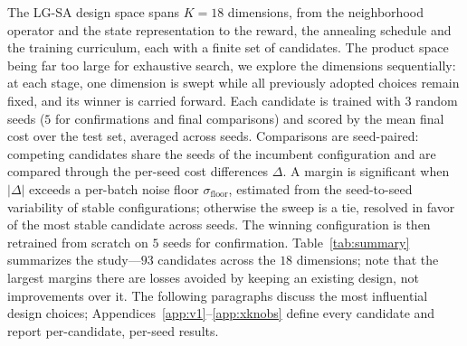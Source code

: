 \documentclass[letterpaper]{article} %
\begin{document}
The LG-SA design space spans $K=18$ dimensions, from the neighborhood
operator and the state representation to the reward, the annealing schedule
and the training curriculum, each with a finite set of candidates. The
product space being far too large for exhaustive search, we explore the
dimensions sequentially: at each stage, one dimension is swept while all
previously adopted choices remain fixed, and its winner is carried forward.
Each candidate is trained with $3$ random seeds ($5$ for confirmations and
final comparisons) and scored by the mean final cost over the test set,
averaged across seeds. Comparisons are seed-paired: competing candidates
share the seeds of the incumbent configuration and are compared through
the per-seed cost differences $\Delta$. A margin is significant when
$|\Delta|$ exceeds a per-batch noise floor $\sigma_{\mathrm{floor}}$,
estimated from the seed-to-seed variability of stable configurations;
otherwise the sweep is a tie, resolved in favor of the most stable
candidate across seeds. The winning configuration is then retrained
from scratch on $5$ seeds for confirmation. Table~\ref{tab:summary}
summarizes the study---$93$ candidates across the $18$ dimensions; note
that the largest margins there are losses avoided by keeping an existing
design, not improvements over it. The following paragraphs discuss the
most influential design choices; Appendices~\ref{app:v1}--\ref{app:xknobs}
define every candidate and report per-candidate, per-seed results.
\end{document}
